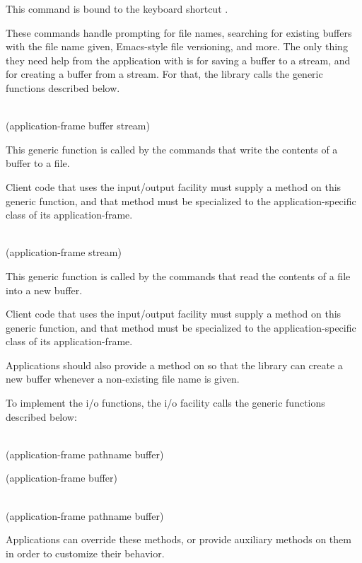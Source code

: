 This command is bound to the keyboard shortcut .

These commands handle prompting for file names, searching for existing
buffers with the file name given, Emacs-style file versioning, and
more.  The only thing they need help from the application with is for
saving a buffer to a stream, and for creating a buffer from a stream.
For that, the \sysname{} library calls the generic functions described
below.

\\
{(application-frame buffer stream)}

This generic function is called by the commands that write the
contents of a buffer to a file.

Client code that uses the \sysname{} input/output facility must supply
a method on this generic function, and that method must be specialized
to the application-specific class of its application-frame.

\\
{(application-frame stream)}

This generic function is called by the commands that read the
contents of a file into a new buffer.

Client code that uses the \sysname{} input/output facility must supply
a method on this generic function, and that method must be specialized
to the application-specific class of its application-frame.

Applications should also provide a method on
 so that the \sysname{}
library can create a new buffer whenever a non-existing file name is
given.

To implement the i/o functions, the \sysname{} i/o facility calls the
generic functions described below:

\\
{(application-frame pathname buffer)}

 {(application-frame buffer)}

\\
{(application-frame pathname buffer)}

Applications can override these methods, or provide auxiliary methods
on them in order to customize their behavior.
